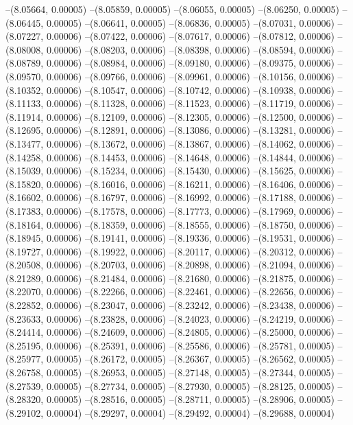 --(8.05664, 0.00005)
--(8.05859, 0.00005)
--(8.06055, 0.00005)
--(8.06250, 0.00005)
--(8.06445, 0.00005)
--(8.06641, 0.00005)
--(8.06836, 0.00005)
--(8.07031, 0.00006)
--(8.07227, 0.00006)
--(8.07422, 0.00006)
--(8.07617, 0.00006)
--(8.07812, 0.00006)
--(8.08008, 0.00006)
--(8.08203, 0.00006)
--(8.08398, 0.00006)
--(8.08594, 0.00006)
--(8.08789, 0.00006)
--(8.08984, 0.00006)
--(8.09180, 0.00006)
--(8.09375, 0.00006)
--(8.09570, 0.00006)
--(8.09766, 0.00006)
--(8.09961, 0.00006)
--(8.10156, 0.00006)
--(8.10352, 0.00006)
--(8.10547, 0.00006)
--(8.10742, 0.00006)
--(8.10938, 0.00006)
--(8.11133, 0.00006)
--(8.11328, 0.00006)
--(8.11523, 0.00006)
--(8.11719, 0.00006)
--(8.11914, 0.00006)
--(8.12109, 0.00006)
--(8.12305, 0.00006)
--(8.12500, 0.00006)
--(8.12695, 0.00006)
--(8.12891, 0.00006)
--(8.13086, 0.00006)
--(8.13281, 0.00006)
--(8.13477, 0.00006)
--(8.13672, 0.00006)
--(8.13867, 0.00006)
--(8.14062, 0.00006)
--(8.14258, 0.00006)
--(8.14453, 0.00006)
--(8.14648, 0.00006)
--(8.14844, 0.00006)
--(8.15039, 0.00006)
--(8.15234, 0.00006)
--(8.15430, 0.00006)
--(8.15625, 0.00006)
--(8.15820, 0.00006)
--(8.16016, 0.00006)
--(8.16211, 0.00006)
--(8.16406, 0.00006)
--(8.16602, 0.00006)
--(8.16797, 0.00006)
--(8.16992, 0.00006)
--(8.17188, 0.00006)
--(8.17383, 0.00006)
--(8.17578, 0.00006)
--(8.17773, 0.00006)
--(8.17969, 0.00006)
--(8.18164, 0.00006)
--(8.18359, 0.00006)
--(8.18555, 0.00006)
--(8.18750, 0.00006)
--(8.18945, 0.00006)
--(8.19141, 0.00006)
--(8.19336, 0.00006)
--(8.19531, 0.00006)
--(8.19727, 0.00006)
--(8.19922, 0.00006)
--(8.20117, 0.00006)
--(8.20312, 0.00006)
--(8.20508, 0.00006)
--(8.20703, 0.00006)
--(8.20898, 0.00006)
--(8.21094, 0.00006)
--(8.21289, 0.00006)
--(8.21484, 0.00006)
--(8.21680, 0.00006)
--(8.21875, 0.00006)
--(8.22070, 0.00006)
--(8.22266, 0.00006)
--(8.22461, 0.00006)
--(8.22656, 0.00006)
--(8.22852, 0.00006)
--(8.23047, 0.00006)
--(8.23242, 0.00006)
--(8.23438, 0.00006)
--(8.23633, 0.00006)
--(8.23828, 0.00006)
--(8.24023, 0.00006)
--(8.24219, 0.00006)
--(8.24414, 0.00006)
--(8.24609, 0.00006)
--(8.24805, 0.00006)
--(8.25000, 0.00006)
--(8.25195, 0.00006)
--(8.25391, 0.00006)
--(8.25586, 0.00006)
--(8.25781, 0.00005)
--(8.25977, 0.00005)
--(8.26172, 0.00005)
--(8.26367, 0.00005)
--(8.26562, 0.00005)
--(8.26758, 0.00005)
--(8.26953, 0.00005)
--(8.27148, 0.00005)
--(8.27344, 0.00005)
--(8.27539, 0.00005)
--(8.27734, 0.00005)
--(8.27930, 0.00005)
--(8.28125, 0.00005)
--(8.28320, 0.00005)
--(8.28516, 0.00005)
--(8.28711, 0.00005)
--(8.28906, 0.00005)
--(8.29102, 0.00004)
--(8.29297, 0.00004)
--(8.29492, 0.00004)
--(8.29688, 0.00004)
